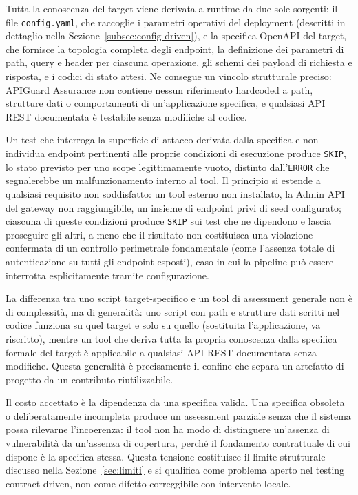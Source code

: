 Tutta la conoscenza del target viene derivata a runtime da due sole sorgenti: il file \texttt{config.yaml}, che raccoglie i parametri operativi del deployment (descritti in dettaglio nella Sezione~\ref{subsec:config-driven}), e la specifica OpenAPI del target, che fornisce la topologia completa degli endpoint, la definizione dei parametri di path, query e header per ciascuna operazione, gli schemi dei payload di richiesta e risposta, e i codici di stato attesi. Ne consegue un vincolo strutturale preciso: APIGuard Assurance non contiene nessun riferimento hardcoded a path, strutture dati o comportamenti di un'applicazione specifica, e qualsiasi \gls{API} REST documentata è testabile senza modifiche al codice.

Un test che interroga la superficie di attacco derivata dalla specifica e non individua endpoint pertinenti alle proprie condizioni di esecuzione produce \texttt{SKIP}, lo stato previsto per uno scope legittimamente vuoto, distinto dall'\texttt{ERROR} che segnalerebbe un malfunzionamento interno al tool. Il principio si estende a qualsiasi requisito non soddisfatto: un tool esterno non installato, la Admin \gls{API} del gateway non raggiungibile, un insieme di endpoint privi di seed configurato; ciascuna di queste condizioni produce \texttt{SKIP} sui test che ne dipendono e lascia proseguire gli altri, a meno che il risultato non costituisca una violazione confermata di un controllo perimetrale fondamentale (come l'assenza totale di autenticazione su tutti gli endpoint esposti), caso in cui la pipeline può essere interrotta esplicitamente tramite configurazione.

La differenza tra uno script target-specifico e un tool di assessment generale non è di complessità, ma di generalità: uno script con path e strutture dati scritti nel codice funziona su quel target e solo su quello (sostituita l'applicazione, va riscritto), mentre un tool che deriva tutta la propria conoscenza dalla specifica formale del target è applicabile a qualsiasi \gls{API} REST documentata senza modifiche. Questa generalità è precisamente il confine che separa un artefatto di progetto da un contributo riutilizzabile.

Il costo accettato è la dipendenza da una specifica valida. Una specifica obsoleta o deliberatamente incompleta produce un assessment parziale senza che il sistema possa rilevarne l'incoerenza: il tool non ha modo di distinguere un'assenza di vulnerabilità da un'assenza di copertura, perché il fondamento contrattuale di cui dispone è la specifica stessa. Questa tensione costituisce il limite strutturale discusso nella Sezione~\ref{sec:limiti} e si qualifica come problema aperto nel testing contract-driven, non come difetto correggibile con intervento locale.


